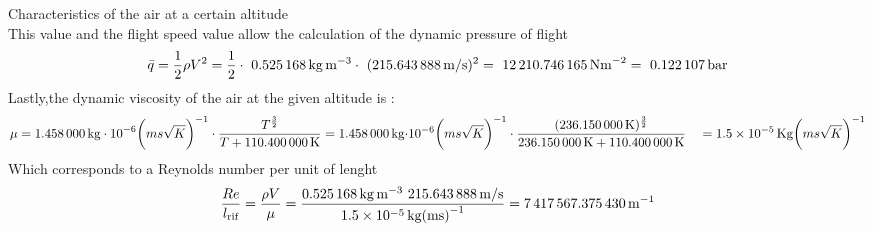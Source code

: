 \documentclass[[12pt,twoside]{book}
\begin{document}
\begin{myExampleX}{Characteristics of the air at a certain altitude}{}
\[\]
%
This value and the flight speed value allow the calculation of the dynamic pressure of flight
\[
\bar{q}=\frac{1}{2} \rho V^{2} =\frac{1}{2}\cdot\ \SI[round-precision=3]{\myDensity}{kg~m^{-3}} \cdot\ (\SI[round-precision=2]{\mySpeedMs}{m/s})^{2} =~\SI[round-precision=2]{\myDynamicpressureNm}{N m^{-2}}=~\SI[round-precision=3]{\myDynamicpressureBar}{bar}
\]
Lastly,the dynamic viscosity of the air at the given  altitude is :
\[
\begin{split}
 \mu =  \SI[round-precision=3]{\myCone}{{kg}\cdot 10^{-6}} \biggl({m s \sqrt{K} }\biggr)^{-1} \cdot \frac {T^{\frac{3}{2}}}{T+\SI[round-precision=1]{\myCtwo}{K}}     
& {}=
 \SI[round-precision=3]{\myCone}{kg}{\cdot 10^{-6}} \biggl({m s \sqrt{K} }\biggr)^{-1} \cdot \frac {(\SI[round-precision=2]{\myTemperatureK}{K})^{\frac{3}{2}}}{\SI[round-precision=2]{\myTemperatureK}{K}+\SI[round-precision=1]{\myCtwo}{K}} 
 & {}=
 \SI[round-precision=2,scientific-notation=true]{\myDynamicviscosity }{Kg}{\biggl({m s \sqrt{K} }\biggr)^{-1}}
 \end{split}
\]
Which corresponds to a Reynolds number per unit of lenght
\[
 \frac{ Re }{l_\text{rif} } =\frac{ \rho V}{\mu }=\frac{ \SI[round-precision=3]{\myDensity}{kg~m^{-3}}~ \SI[round-precision=2]{\mySpeedMs}{m/s}}{\SI[round-precision=2,scientific-notation=true]{\myDynamicviscosity }
 {kg (m s)^{-1} }}
 = \SI[round-precision=0]{\myReynoldsnumeberperunitoflenght}{m^{-1}}
\]

\end{myExampleX}
\end{document}
